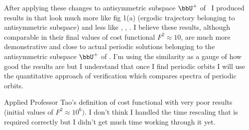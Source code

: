 \begin{description}
{After applying these changes to antisymmetric subspace $\bbU^+$ of \KS\ I
produced results in  that look much more like
 fig 1(a) (ergodic trajectory belonging to antisymmetric
subspace)  and less like , ,
. I believe these results, although comparable in
their final values of cost functional $F^2 \approx 10$, are much more
demonstrative and close to actual periodic solutions belonging to the
antisymmetric subspace $\bbU^+$ of \KS. I'm using the similarity as a gauge of how
good the results are but I understand that once I find periodic orbits I
will use the quantitative approach of verification which compares spectra
of periodic orbits.

Applied Professor Tao's definition of cost functional 
with very poor results (initial values of $F^2 \approx 10^6)$. I don't think I
handled the time rescaling that is required correctly but I didn't get much
time working through it yet.
}

\end{description}
